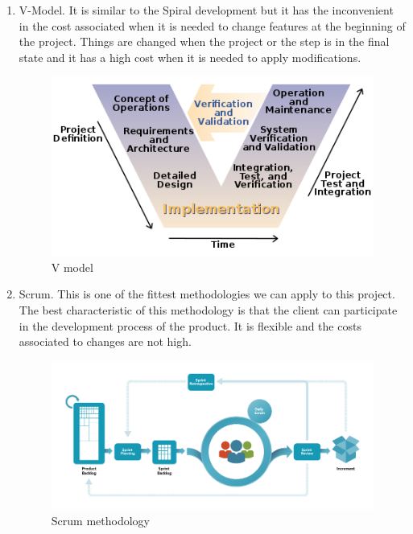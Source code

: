 \begin{enumerate}
\item V-Model. It is similar to the Spiral development but it has the inconvenient in the cost associated when it is needed to change features at the beginning of the project. Things are changed when the project or the step is in the final state and it has a high cost when it is needed to apply modifications.

\begin{figure}[H]
\begin{centering}
\includegraphics[scale=0.5]{IMGS/v_model.png}
\caption{V model \label{V model}}
\end{centering}
\end{figure} 

\item Scrum. This is one of the fittest methodologies we can apply to this project. The best characteristic of this methodology is that the client can participate in the development process of the product. It is flexible and the costs associated to changes are not high.

\begin{figure}[H]
\begin{centering}
\includegraphics[scale=0.5]{IMGS/Scrum.png}
\caption{Scrum methodology \label{Scrum methodology}}
\end{centering}
\end{figure} 

\end{enumerate}

